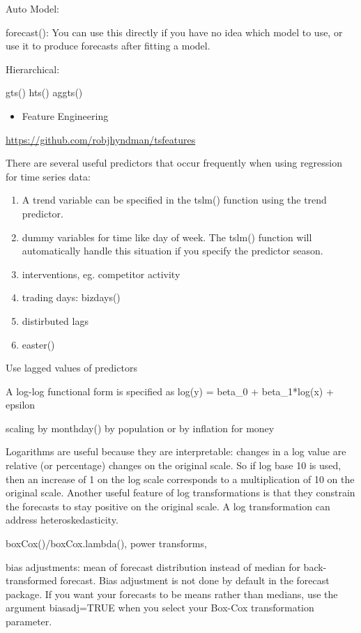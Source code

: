 \documentclass[]{book}
\providecommand{\tightlist}{%
  \setlength{\itemsep}{0pt}\setlength{\parskip}{0pt}}
\theoremstyle{definition}
\theoremstyle{definition}
\theoremstyle{definition}
\theoremstyle{remark}
\begin{document}
Auto Model:

forecast(): You can use this directly if you have no idea which model to
use, or use it to produce forecasts after fitting a model.

Hierarchical:

gts() \textbar{} hts() \textbar{} aggts()

\begin{itemize}
\tightlist
\item
  Feature Engineering
\end{itemize}

\url{https://github.com/robjhyndman/tsfeatures}

There are several useful predictors that occur frequently when using
regression for time series data:

\begin{enumerate}
\def\labelenumi{\arabic{enumi})}
\item
  A trend variable can be specified in the tslm() function using the
  trend predictor.
\item
  dummy variables for time like day of week. The tslm() function will
  automatically handle this situation if you specify the predictor
  season.
\item
  interventions, eg. competitor activity
\item
  trading days: bizdays()
\item
  distirbuted lags
\item
  easter()
\end{enumerate}

Use lagged values of predictors

A log-log functional form is specified as log(y) = beta\_0 +
beta\_1*log(x) + epsilon

scaling by monthday() by population or by inflation for money

Logarithms are useful because they are interpretable: changes in a log
value are relative (or percentage) changes on the original scale. So if
log base 10 is used, then an increase of 1 on the log scale corresponds
to a multiplication of 10 on the original scale. Another useful feature
of log transformations is that they constrain the forecasts to stay
positive on the original scale. A log transformation can address
heteroskedasticity.

boxCox()/boxCox.lambda(), power transforms,

bias adjustments: mean of forecast distribution instead of median for
back-transformed forecast. Bias adjustment is not done by default in the
forecast package. If you want your forecasts to be means rather than
medians, use the argument biasadj=TRUE when you select your Box-Cox
transformation parameter.
\end{document}
